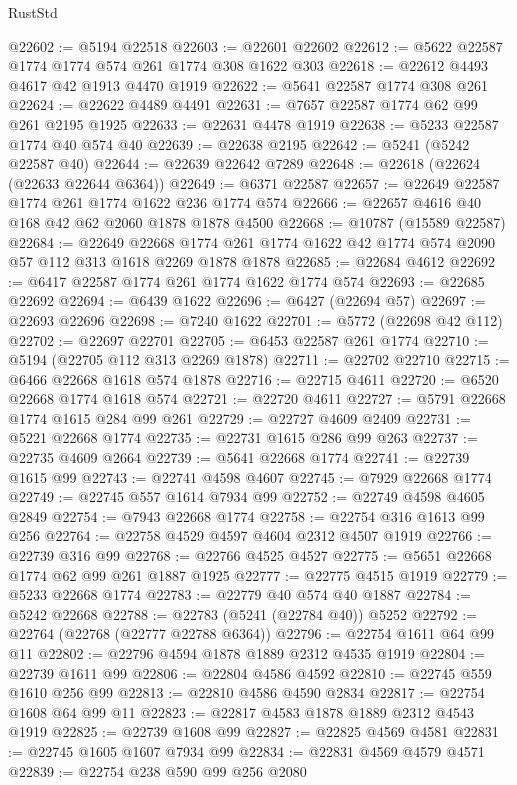\begin{lexlean}{RustStd}
\begin{coremodule}
@22602 := @5194 @22518
@22603 := @22601 @22602
@22612 := @5622 @22587 @1774 @1774 @574 @261 @1774 @308 @1622 @303
@22618 := @22612 @4493 @4617 @42 @1913 @4470 @1919
@22622 := @5641 @22587 @1774 @308 @261
@22624 := @22622 @4489 @4491
@22631 := @7657 @22587 @1774 @62 @99 @261 @2195 @1925
@22633 := @22631 @4478 @1919
@22638 := @5233 @22587 @1774 @40 @574 @40
@22639 := @22638 @2195
@22642 := @5241 (@5242 @22587 @40)
@22644 := @22639 @22642 @7289
@22648 := @22618 (@22624 (@22633 @22644 @6364))
@22649 := @6371 @22587
@22657 := @22649 @22587 @1774 @261 @1774 @1622 @236 @1774 @574
@22666 := @22657 @4616 @40 @168 @42 @62 @2060 @1878 @1878 @4500
@22668 := @10787 (@15589 @22587)
@22684 := @22649
    @22668
    @1774
    @261
    @1774
    @1622
    @42
    @1774
    @574
    @2090
    @57
    @112
    @313
    @1618
    @2269
    @1878
    @1878
@22685 := @22684 @4612
@22692 := @6417 @22587 @1774 @261 @1774 @1622 @1774 @574
@22693 := @22685 @22692
@22694 := @6439 @1622
@22696 := @6427 (@22694 @57)
@22697 := @22693 @22696
@22698 := @7240 @1622
@22701 := @5772 (@22698 @42 @112)
@22702 := @22697 @22701
@22705 := @6453 @22587 @261 @1774
@22710 := @5194 (@22705 @112 @313 @2269 @1878)
@22711 := @22702 @22710
@22715 := @6466 @22668 @1618 @574 @1878
@22716 := @22715 @4611
@22720 := @6520 @22668 @1774 @1618 @574
@22721 := @22720 @4611
@22727 := @5791 @22668 @1774 @1615 @284 @99 @261
@22729 := @22727 @4609 @2409
@22731 := @5221 @22668 @1774
@22735 := @22731 @1615 @286 @99 @263
@22737 := @22735 @4609 @2664
@22739 := @5641 @22668 @1774
@22741 := @22739 @1615 @99
@22743 := @22741 @4598 @4607
@22745 := @7929 @22668 @1774
@22749 := @22745 @557 @1614 @7934 @99
@22752 := @22749 @4598 @4605 @2849
@22754 := @7943 @22668 @1774
@22758 := @22754 @316 @1613 @99 @256
@22764 := @22758 @4529 @4597 @4604 @2312 @4507 @1919
@22766 := @22739 @316 @99
@22768 := @22766 @4525 @4527
@22775 := @5651 @22668 @1774 @62 @99 @261 @1887 @1925
@22777 := @22775 @4515 @1919
@22779 := @5233 @22668 @1774
@22783 := @22779 @40 @574 @40 @1887
@22784 := @5242 @22668
@22788 := @22783 (@5241 (@22784 @40)) @5252
@22792 := @22764 (@22768 (@22777 @22788 @6364))
@22796 := @22754 @1611 @64 @99 @11
@22802 := @22796 @4594 @1878 @1889 @2312 @4535 @1919
@22804 := @22739 @1611 @99
@22806 := @22804 @4586 @4592
@22810 := @22745 @559 @1610 @256 @99
@22813 := @22810 @4586 @4590 @2834
@22817 := @22754 @1608 @64 @99 @11
@22823 := @22817 @4583 @1878 @1889 @2312 @4543 @1919
@22825 := @22739 @1608 @99
@22827 := @22825 @4569 @4581
@22831 := @22745 @1605 @1607 @7934 @99
@22834 := @22831 @4569 @4579 @4571
@22839 := @22754 @238 @590 @99 @256 @2080

\end{coremodule}
\end{lexlean}
